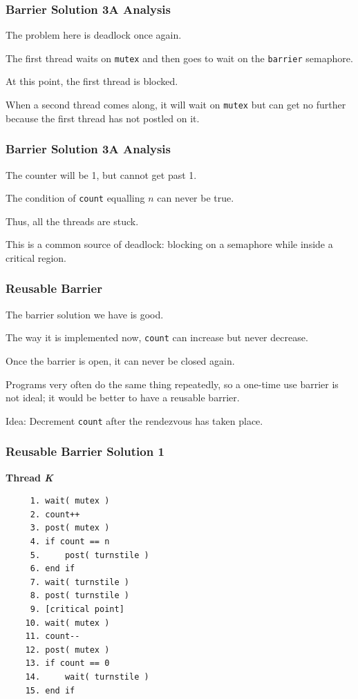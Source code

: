 \begin{frame}
\frametitle{Barrier Solution 3A Analysis}

The problem here is deadlock once again. 

The first thread waits on \texttt{mutex} and then goes to wait on the \texttt{barrier} semaphore. 

At this point, the first thread is blocked.

When a second thread comes along, it will wait on \texttt{mutex} but can get no further because the first thread has not postled on it. 


\end{frame}

\begin{frame}
\frametitle{Barrier Solution 3A Analysis}

The counter will be 1, but cannot get past 1. 

The condition of \texttt{count} equalling $n$ can never be true. 

Thus, all the threads are stuck. 

This is a common source of deadlock: blocking on a semaphore while inside a critical region.

\end{frame}

\begin{frame}
\frametitle{Reusable Barrier}

The barrier solution we have is good.

The way it is implemented now, \texttt{count} can increase but never decrease.

Once the barrier is open, it can never be closed again.

Programs very often do the same thing repeatedly, so a one-time use barrier is not ideal; it would be better to have a reusable barrier.

Idea: Decrement \texttt{count} after the rendezvous has taken place. 

\end{frame}

\begin{frame}[fragile]
\frametitle{Reusable Barrier Solution 1}

\textbf{Thread \textit{K}}\vspace{-2em}
  \begin{verbatim}
	 1. wait( mutex )
	 2. count++
	 3. post( mutex )
	 4. if count == n
	 5.     post( turnstile )
	 6. end if
	 7. wait( turnstile )
	 8. post( turnstile )
	 9. [critical point]
	10. wait( mutex )
	11. count--
	12. post( mutex )
	13. if count == 0
	14.     wait( turnstile )
	15. end if
  \end{verbatim}
\vspace{-2em}

\end{frame}

